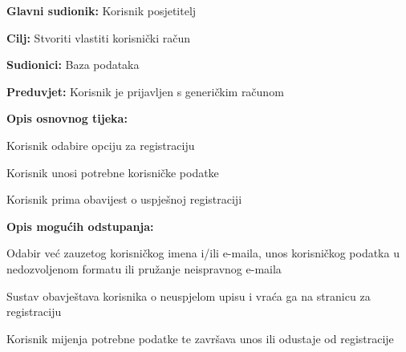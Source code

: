					\noindent {}
					\begin{packed_item}
					
						\item \textbf{Glavni sudionik: } Korisnik posjetitelj
						\item  \textbf{Cilj:} Stvoriti vlastiti korisnički račun
						\item  \textbf{Sudionici:} Baza podataka
						\item  \textbf{Preduvjet:} Korisnik je prijavljen s generičkim računom
						\item  \textbf{Opis osnovnog tijeka:}
						
						\item[] \begin{packed_enum}
							
							\item Korisnik odabire opciju za registraciju
							\item Korisnik unosi potrebne korisničke podatke
							\item Korisnik prima obavijest o uspješnoj registraciji

						\end{packed_enum}
						
						\item  \textbf{Opis mogućih odstupanja:}
						
						\item[] \begin{packed_item}
							
							\item[2.a] Odabir već zauzetog korisničkog imena i/ili e-maila, unos korisničkog podatka u nedozvoljenom formatu ili pružanje neispravnog e-maila
							\item[] \begin{packed_enum}
								
								\item Sustav obavještava korisnika o neuspjelom upisu i vraća ga na stranicu za registraciju
								\item Korisnik mijenja potrebne podatke te završava unos ili odustaje od registracije
								
							\end{packed_enum}
							
						\end{packed_item}
					\end{packed_item}
					
